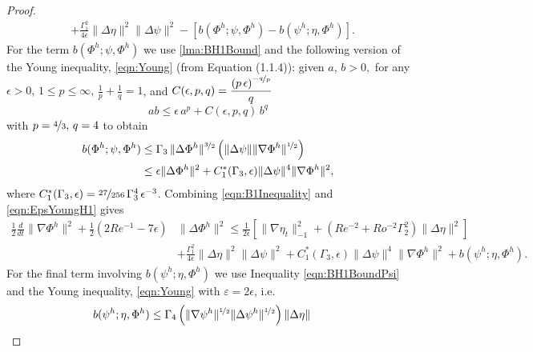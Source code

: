 \begin{proof}
\begin{equation}
\begin{split}
     & + \frac{\Gamma_1^2}{4 \epsilon}\|\Delta \eta\|^2 \|\Delta \psi\|^2  -
     \left[b(\Phi^h;\psi,\Phi^h) - b(\psi^h;\eta,\Phi^h)\right].
    \end{split}
    \label{eqn:B1Inequality}
  \end{equation}
  For the term $b(\Phi^h; \psi, \Phi^h)$ we use \autoref{lma:BH1Bound} and the
  following version of the Young inequality, \eqref{eqn:Young} (from \cite{Layton08} Equation (1.1.4)):
  given $a,\,b>0,$ for any $\epsilon > 0,\, 1\le p \le \infty,\, \frac{1}{p} +
  \frac{1}{q} = 1$, and
  $C(\epsilon,p,q)=\dfrac{\left(p\,\epsilon\right)^{-\nicefrac{q}{p}}}{q}$
  \begin{equation*}
    ab \le \epsilon\, a^p + C(\epsilon,p,q)\, b^q
  \end{equation*}
  with $p=\nicefrac{4}{3},\, q = 4$ to obtain
  \begin{align}
    b(\Phi^h; \psi, \Phi^h) &\le \Gamma_3\, \|\Delta \Phi^h\|^{\nicefrac{3}{2}}
      \left(\|\Delta \psi\| \|\nabla \Phi^h\|^{\nicefrac{1}{2}}\right)
      \nonumber \\
    &\le \epsilon \|\Delta \Phi^h\|^2 + C^*_1(\Gamma_3,\epsilon) \|\Delta \psi\|^4
      \|\nabla \Phi^h\|^2,
    \label{eqn:EpsYoungH1}
  \end{align}
  where $C^*_1(\Gamma_3,\epsilon) = \nicefrac{27}{256}\,\Gamma_3^4\,\epsilon^{-3}$.
  Combining \eqref{eqn:B1Inequality} and \eqref{eqn:EpsYoungH1} gives
  \begin{equation}
    \begin{split}
      \frac{1}{2} \frac{d}{dt} \|\nabla \Phi^h\|^2 + \frac{1}{2}\left(2Re^{-1} -
        7 \epsilon \right)
        &\|\Delta \Phi^h\|^2 \le \frac{1}{2 \epsilon}\left[\|\nabla \eta_t\|_{-1}^2
        + \left( Re^{-2} + Ro^{-2} \Gamma_2^2 \right) \|\Delta \eta\|^2\right] \\
      & + \frac{\Gamma_1^2}{4\epsilon}\|\Delta \eta\|^2 \|\Delta \psi\|^2
        + C^*_1(\Gamma_3,\epsilon) \|\Delta \psi\|^4 \|\nabla \Phi^h\|^2
        + b(\psi^h;\eta,\Phi^h).
    \end{split}
    \label{eqn:B2Inequality}
  \end{equation}
  For the final term involving $b(\psi^h; \eta, \Phi^h)$ we use
  Inequality \eqref{eqn:BH1BoundPsi} and the Young inequality, \eqref{eqn:Young} with $\varepsilon =
  2 \epsilon$, i.e.
  \begin{align}
    b(\psi^h; \eta, \Phi^h) &\le \Gamma_4\left(\|\nabla \psi^h\|^{\nicefrac{1}{2}}
      \|\Delta \psi^h\|^{\nicefrac{1}{2}}\right) \|\Delta \eta\|\,

\end{align}
\end{proof}
